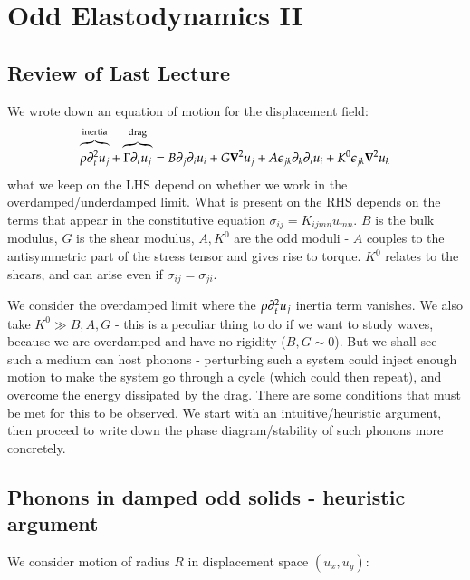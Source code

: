 \section{Odd Elastodynamics II}

\subsection{Review of Last Lecture}
We wrote down an equation of motion for the displacement field:
\begin{equation}
    \overbrace{\rho \p_t^2 u_j}^{\text{inertia}} + \overbrace{\Gamma \p_t u_j}^{\text{drag}} = B\p_j \p_i u_i + G \nabla^2 u_j + A\e_{jk}\p_k \p_i u_i + K^0\e_{jk}\nabla^2 u_k
\end{equation}
what we keep on the LHS depend on whether we work in the overdamped/underdamped limit. What is present on the RHS depends on the terms that appear in the constitutive equation $\sigma_{ij} = K_{ijmn}u_{mn}$. $B$ is the bulk modulus, $G$ is the shear modulus, $A, K^0$ are the odd moduli - $A$ couples to the antisymmetric part of the stress tensor and gives rise to torque. $K^0$ relates to the shears, and can arise even if $\sigma_{ij} = \sigma_{ji}$.

We consider the overdamped limit where the $\rho\partial_t^2 u_j$ inertia term vanishes. We also take $K^0 \gg B, A, G$ - this is a peculiar thing to do if we want to study waves, because we are overdamped and have no rigidity ($B, G \sim 0$). But we shall see such a medium can host phonons - perturbing such a system could inject enough motion to make the system go through a cycle (which could then repeat), and overcome the energy dissipated by the drag. There are some conditions that must be met for this to be observed. We start with an intuitive/heuristic argument, then proceed to write down the phase diagram/stability of such phonons more concretely.


\subsection{Phonons in damped odd solids - heuristic argument}

We consider motion of radius $R$ in displacement space $(u_x, u_y)$:

